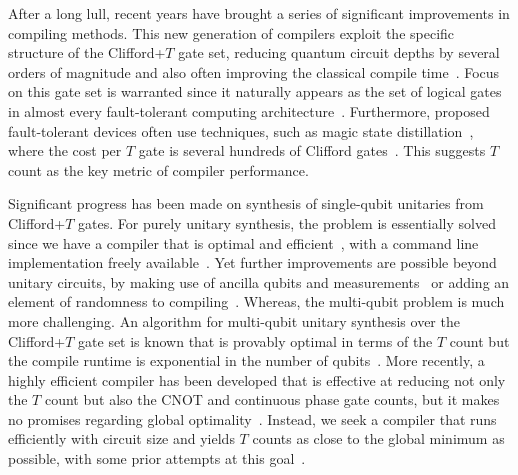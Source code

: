 \documentclass[notitlepage]{article}
\theoremstyle{definition}
\theoremstyle{problem}
\theoremstyle{lemma}
\begin{document}
		After a long lull, recent years have brought a series of significant improvements in compiling methods.  This new generation of compilers exploit the specific structure of the Clifford+$T$ gate set, reducing quantum circuit depths by several orders of magnitude and also often improving the classical compile time~\cite{kliuchnikov13,selinger13,gosset14,RS14}.   Focus on this gate set is warranted since it naturally appears as the set of logical gates in almost every fault-tolerant computing architecture~\cite{ReviewPaper}.  Furthermore, proposed fault-tolerant devices often use techniques, such as magic state distillation~\cite{BraKit05},  where the cost per $T$ gate is several hundreds of Clifford gates~\cite{RHG01a,Fowler12,gorman17}.  This suggests $T$ count as the key metric of compiler performance.
		
		Significant progress has been made on synthesis of single-qubit unitaries from Clifford+$T$ gates.  For purely unitary synthesis, the problem is essentially solved since we have a compiler that is optimal and efficient~\cite{kliuchnikov13,RS14}, with a command line implementation freely available~\cite{gridsynth}.  Yet further improvements are possible beyond unitary circuits, by making use of ancilla qubits and measurements~\cite{paetznick14,bocharov15,bocharov15b} or adding an element of randomness to compiling~\cite{campbell17shorter,hastings2016mixing}.  Whereas, the multi-qubit problem is much more challenging.  An algorithm for multi-qubit  unitary synthesis over the Clifford+$T$ gate set is known that is provably optimal in terms of the $T$ count but the compile runtime is exponential in the number of qubits~\cite{gosset14}.  More recently, a highly efficient compiler has been developed that is effective at reducing not only the $T$ count but also the CNOT and continuous phase gate counts, but it makes no promises regarding global optimality~\cite{2067}. Instead, we seek a compiler that runs efficiently with circuit size and yields $T$ counts as close to the global minimum as possible, with some prior attempts at this goal~\cite{amy2013meet}. 
		
\end{document}

